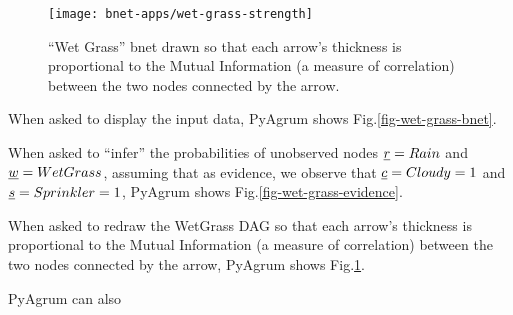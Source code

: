 \begin{figure}[h!]
\centering
\texttt{[image: bnet-apps/wet-grass-strength]}
\caption{\enquote{Wet Grass} bnet drawn so that each arrow's thickness
is proportional to the Mutual Information (a measure of
correlation) between the two nodes connected by the arrow.}
\label{fig-wet-grass-strength}
\end{figure}


When asked to display the input data, PyAgrum shows Fig.\ref{fig-wet-grass-bnet}.



When asked to \enquote{infer} the probabilities of unobserved nodes ${\underline{r}}=Rain$
and ${\underline{w}}=WetGrass$,
assuming that as evidence, we observe that ${\underline{c}}=Cloudy=1$ and ${\underline{s}}=Sprinkler=1$, PyAgrum shows Fig.\ref{fig-wet-grass-evidence}.

When asked to redraw the WetGrass DAG so that each arrow's thickness
is proportional to the Mutual Information (a measure of
correlation) between the two nodes connected by the arrow,
PyAgrum shows Fig.\ref{fig-wet-grass-strength}.


PyAgrum can also  


